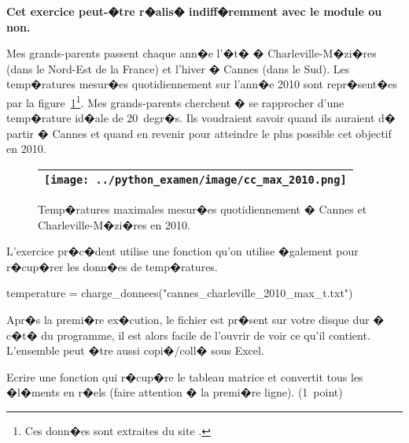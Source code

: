 \begin{xexercice}
{Ecrire la r�ponse en commentaire de la fonction.  (2~points)
\fi



\end{xexercice}

\newpage 
\exosubject{}
\begin{xexercice}\label{td_note_label_2012}%

\textbf{Cet exercice peut-�tre r�alis� indiff�remment avec le module  ou non.}

Mes grands-parents passent chaque ann�e l'�t� � Charleville-M�zi�res (dans le Nord-Est de la France) et l'hiver � Cannes (dans le Sud). Les temp�ratures mesur�es quotidiennement sur l'ann�e 2010 sont repr�sent�es par la figure~\ref{temperature_cannes_charleville_2010}\footnote{Ces donn�es sont extraites du site .}. Mes grands-parents cherchent � se rapprocher d'une temp�rature id�ale de 20~degr�s. Ils voudraient savoir quand ils auraient d� partir � Cannes et quand en revenir pour atteindre le plus possible cet objectif en 2010.

\begin{figure}[ht]
\begin{center}\begin{tabular}{|c|}\hline 
\texttt{[image: ../python\_examen/image/cc\_max\_2010.png]} \\ \hline
\end{tabular}
\end{center}
\caption{Temp�ratures maximales mesur�es quotidiennement � Cannes et Charleville-M�zi�res en 2010.}
\label{temperature_cannes_charleville_2010}
\end{figure}

L'exercice pr�c�dent utilise une fonction  qu'on utilise �galement pour r�cup�rer les donn�es de temp�ratures.

\begin{verbatimx}
temperature = charge_donnees("cannes_charleville_2010_max_t.txt")
\end{verbatimx}

Apr�s la premi�re ex�cution, le fichier est pr�sent sur votre disque dur � c�t� du programme, il est alors facile de l'ouvrir de voir ce qu'il contient. L'ensemble peut �tre aussi copi�/coll� sous Excel.


\exequest Ecrire une fonction qui r�cup�re le tableau matrice et convertit tous les �l�ments en r�els (faire attention � la premi�re ligne). (1~point)


\end{xexercice}
